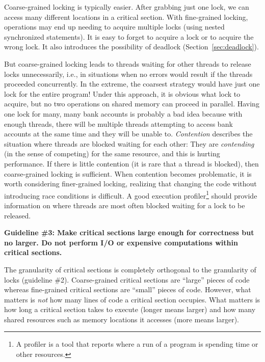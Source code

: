 \documentclass[10pt]{article}
\begin{document}
Coarse-grained locking is typically easier.  After grabbing just one
lock, we can access many different locations in a critical section.
With fine-grained locking, operations may end up needing to acquire
multiple locks (using nested synchronized statements).  It is easy to
forget to acquire a lock or to acquire the wrong lock.  It also
introduces the possibility of deadlock (Section~\ref{sec:deadlock}).

But coarse-grained locking leads to threads waiting for other threads
to release locks unnecessarily, i.e., in situations when no errors
would result if the threads proceeded concurrently.  In the extreme,
the coarsest strategy would have just one lock for the entire program!
Under this approach, it is obvious what lock to acquire, but no two
operations on shared memory can proceed in parallel.  Having one lock
for many, many bank accounts is probably a bad idea because with
enough threads, there will be multiple threads attempting to access
bank accounts at the same time and they will be unable to.
\emph{Contention} describes the situation where threads are blocked
waiting for each other: They are \emph{contending} (in the sense of
competing) for the same resource, and this is hurting performance.  If
there is little contention (it is rare that a thread is blocked), then
coarse-grained locking is sufficient.  When contention becomes
problematic, it is worth considering finer-grained locking, realizing
that changing the code without introducing race conditions is
difficult.  A good execution profiler\footnote{A profiler is a tool
  that reports where a run of a program is spending time or other resources.} should provide information on
where threads are most often blocked waiting for a lock to be
released.

\medskip
\noindent\textbf{Guideline \#3: Make critical sections large enough
  for correctness but no larger.  Do not perform I/O or expensive
  computations within critical sections.}
\medskip

The granularity of critical sections is completely orthogonal to the
granularity of locks (guideline \#2).  Coarse-grained critical
sections are ``large'' pieces of code whereas fine-grained critical
sections are ``small'' pieces of code.  However, what matters is
\emph{not} how many lines of code a critical section occupies.  What
matters is how long a critical section takes to execute (longer means
larger) and how many shared resources such as memory locations it
accesses (more means larger).
\end{document}
